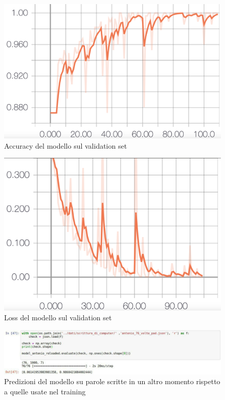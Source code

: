 \documentclass[8pt,notitlepage]{report}
\begin{document}
			\begin{figure}[H]
				\begin{center}
					\includegraphics[scale=.1865]{val_acc_Antonio}
					\caption{Accuracy del modello sul validation set}
					\label{fig:acc_val}
				\end{center}
			\end{figure}
			
			\begin{figure}[H]
				\begin{center}
					\includegraphics[scale=.1865]{val_loss_Antonio}
					\caption{Loss del modello sul validation set}
				\end{center}
			\end{figure}
			
			\begin{figure}
				\begin{center}
					\includegraphics[scale=.5]{test_Antonio}
					\caption{Predizioni del modello su parole scritte in un altro momento rispetto a quelle usate nel training}
					\label{fig:prediction}
				\end{center}
			\end{figure}
			
\end{document}
